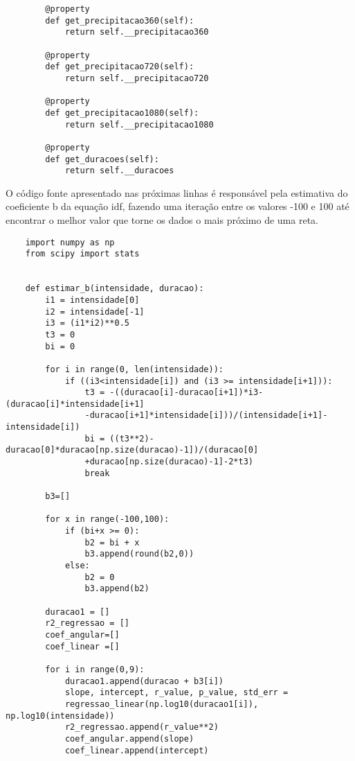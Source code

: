 \begin{apendicesenv}
\begin{verbatim}
        @property
        def get_precipitacao360(self):
            return self.__precipitacao360
    
        @property
        def get_precipitacao720(self):
            return self.__precipitacao720
        
        @property
        def get_precipitacao1080(self):
            return self.__precipitacao1080
    
        @property
        def get_duracoes(self):
            return self.__duracoes
\end{verbatim}

O código fonte apresentado nas próximas linhas é responsável pela estimativa do coeficiente b da equação idf, fazendo uma iteração entre os valores -100 e 100 até encontrar o melhor valor que torne os dados o mais próximo de uma reta.

\begin{verbatim}
    import numpy as np
    from scipy import stats
    
    
    def estimar_b(intensidade, duracao):
        i1 = intensidade[0]
        i2 = intensidade[-1]
        i3 = (i1*i2)**0.5
        t3 = 0
        bi = 0
    
        for i in range(0, len(intensidade)):
            if ((i3<intensidade[i]) and (i3 >= intensidade[i+1])):
                t3 = -((duracao[i]-duracao[i+1])*i3-(duracao[i]*intensidade[i+1]
                -duracao[i+1]*intensidade[i]))/(intensidade[i+1]-intensidade[i])
                bi = ((t3**2)-duracao[0]*duracao[np.size(duracao)-1])/(duracao[0]
                +duracao[np.size(duracao)-1]-2*t3)
                break
        
        b3=[]
    
        for x in range(-100,100):
            if (bi+x >= 0):
                b2 = bi + x
                b3.append(round(b2,0))
            else:
                b2 = 0
                b3.append(b2)
        
        duracao1 = []
        r2_regressao = []
        coef_angular=[]
        coef_linear =[]
    
        for i in range(0,9):
            duracao1.append(duracao + b3[i])
            slope, intercept, r_value, p_value, std_err = 
            regressao_linear(np.log10(duracao1[i]), np.log10(intensidade))
            r2_regressao.append(r_value**2)
            coef_angular.append(slope)
            coef_linear.append(intercept)
        

\end{verbatim}
\end{apendicesenv}
